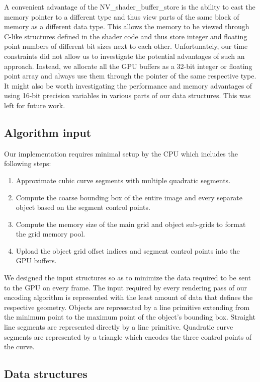 \documentclass[11pt,a4paper,twoside]{article}
\begin{document}
A convenient advantage of the NV\_shader\_buffer\_store is the ability to cast the memory pointer to a different type and thus view parts of the same block of memory as a different data type. This allows the memory to be viewed through C-like structures defined in the shader code and thus store integer and floating point numbers of different bit sizes next to each other. Unfortunately, our time constraints did not allow us to investigate the potential advantages of such an approach. Instead, we allocate all the GPU buffers as a 32-bit integer or floating point array and always use them through the pointer of the same respective type. It might also be worth investigating the performance and memory advantages of using 16-bit precision variables in various parts of our data structures. This was left for future work.

\subsection {Algorithm input}

Our implementation requires minimal setup by the CPU which includes the following steps:

\begin {enumerate}
\item
Approximate cubic curve segments with multiple quadratic segments.
\item
Compute the coarse bounding box of the entire image and every separate object based on the segment control points.
\item
Compute the memory size of the main grid and object sub-grids to format the grid memory pool.
\item
Upload the object grid offset indices and segment control points into the GPU buffers.
\end {enumerate}

We designed the input structures so as to minimize the data required to be sent to the GPU on every frame. The input required by every rendering pass of our encoding algorithm is represented with the least amount of data that defines the respective geometry. Objects are represented by a line primitive extending from the minimum point to the maximum point of the object's bounding box. Straight line segments are represented directly by a line primitive. Quadratic curve segments are represented by a triangle which encodes the three control points of the curve.

\subsection{Data structures}
\end{document}
